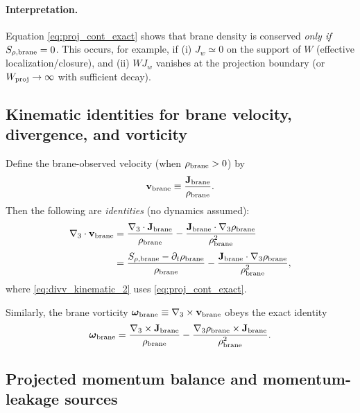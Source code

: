 \documentclass[11pt]{article}
\begin{document}
\paragraph{Interpretation.}
Equation \eqref{eq:proj_cont_exact} shows that brane density is conserved
\emph{only if} $S_{\rho,{\rm brane}}=0$. This occurs, for example, if
(i) $J_w\simeq 0$ on the support of $W$ (effective localization/closure),
and (ii) $WJ_w$ vanishes at the projection boundary (or $W_{\rm proj}\to\infty$
with sufficient decay).

\subsection{Kinematic identities for brane velocity, divergence, and vorticity}
\label{app:brane_kinematics}

Define the brane-observed velocity (when $\rho_{\rm brane}>0$) by
\begin{equation}
\mathbf{v}_{\rm brane}\equiv \frac{\mathbf{J}_{\rm brane}}{\rho_{\rm brane}}.
\label{eq:vbrane_def}
\end{equation}
Then the following are \emph{identities} (no dynamics assumed):
\begin{align}
\nabla_3\cdot \mathbf{v}_{\rm brane}
&=
\frac{\nabla_3\cdot \mathbf{J}_{\rm brane}}{\rho_{\rm brane}}
-
\frac{\mathbf{J}_{\rm brane}\cdot \nabla_3\rho_{\rm brane}}{\rho_{\rm brane}^2}
\label{eq:divv_kinematic_1}
\\[3pt]
&=
\frac{S_{\rho,{\rm brane}}-\partial_t\rho_{\rm brane}}{\rho_{\rm brane}}
-
\frac{\mathbf{J}_{\rm brane}\cdot \nabla_3\rho_{\rm brane}}{\rho_{\rm brane}^2},
\label{eq:divv_kinematic_2}
\end{align}
where \eqref{eq:divv_kinematic_2} uses \eqref{eq:proj_cont_exact}.

Similarly, the brane vorticity $\boldsymbol{\omega}_{\rm brane}\equiv \nabla_3\times \mathbf{v}_{\rm brane}$
obeys the exact identity
\begin{equation}
\boldsymbol{\omega}_{\rm brane}
=
\frac{\nabla_3\times \mathbf{J}_{\rm brane}}{\rho_{\rm brane}}
-
\frac{\nabla_3\rho_{\rm brane}\times \mathbf{J}_{\rm brane}}{\rho_{\rm brane}^2}.
\label{eq:curlv_kinematic}
\end{equation}

\subsection{Projected momentum balance and momentum-leakage sources}
\label{app:projected_momentum}
\end{document}
